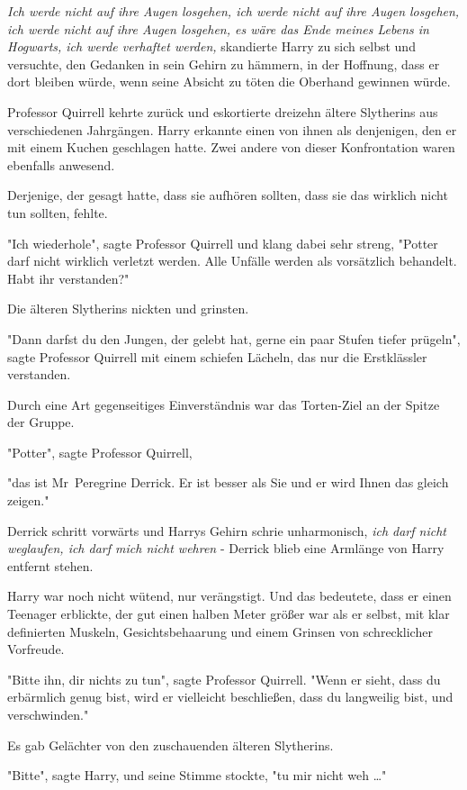 {\emph{Ich werde nicht auf ihre Augen losgehen, ich werde nicht auf ihre Augen losgehen, ich werde nicht auf ihre Augen losgehen, es wäre das Ende meines Lebens in Hogwarts, ich werde verhaftet werden,} skandierte Harry zu sich selbst und versuchte, den Gedanken in sein Gehirn zu hämmern, in der Hoffnung, dass er dort bleiben würde, wenn seine Absicht zu töten die Oberhand gewinnen würde.

Professor Quirrell kehrte zurück und eskortierte dreizehn ältere Slytherins aus verschiedenen Jahrgängen. Harry erkannte einen von ihnen als denjenigen, den er mit einem Kuchen geschlagen hatte. Zwei andere von dieser Konfrontation waren ebenfalls anwesend.

Derjenige, der gesagt hatte, dass sie aufhören sollten, dass sie das wirklich nicht tun sollten, fehlte.

"Ich wiederhole", sagte Professor Quirrell und klang dabei sehr streng, "Potter darf nicht wirklich verletzt werden. Alle Unfälle werden als vorsätzlich behandelt. Habt ihr verstanden?"

Die älteren Slytherins nickten und grinsten.

"Dann darfst du den Jungen, der gelebt hat, gerne ein paar Stufen tiefer prügeln", sagte Professor Quirrell mit einem schiefen Lächeln, das nur die Erstklässler verstanden.

Durch eine Art gegenseitiges Einverständnis war das Torten-Ziel an der Spitze der Gruppe.

"Potter", sagte Professor Quirrell,

"das ist Mr~Peregrine Derrick. Er ist besser als Sie und er wird Ihnen das gleich zeigen."

Derrick schritt vorwärts und Harrys Gehirn schrie unharmonisch, \emph{ich darf nicht weglaufen, ich darf mich nicht wehren} - Derrick blieb eine Armlänge von Harry entfernt stehen.

Harry war noch nicht wütend, nur verängstigt. Und das bedeutete, dass er einen Teenager erblickte, der gut einen halben Meter größer war als er selbst, mit klar definierten Muskeln, Gesichtsbehaarung und einem Grinsen von schrecklicher Vorfreude.

"Bitte ihn, dir nichts zu tun", sagte Professor Quirrell. "Wenn er sieht, dass du erbärmlich genug bist, wird er vielleicht beschließen, dass du langweilig bist, und verschwinden."

Es gab Gelächter von den zuschauenden älteren Slytherins.

"Bitte", sagte Harry, und seine Stimme stockte, "tu mir nicht weh …"

}
